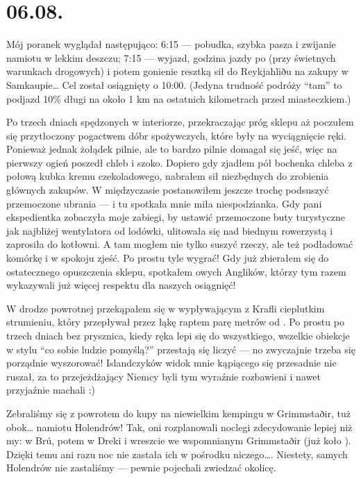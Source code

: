 \chapter*{06.08.}

Mój poranek wyglądał następująco: 6:15 --- pobudka, szybka pasza i zwijanie namiotu w lekkim deszczu; 7:15 --- wyjazd, godzina jazdy po  (przy świetnych warunkach drogowych) i potem gonienie resztką sił do Reykjahliðu na zakupy w Samkaupie… Cel został osiągnięty o 10:00. (Jedyna trudność podróży “tam” to podjazd 10\% długi na około 1 km na ostatnich kilometrach przed miasteczkiem.)

Po trzech dniach spędzonych w interiorze, przekraczając próg sklepu aż poczułem się przytłoczony pogactwem dóbr spożywczych, które były na wyciągnięcie ręki. Ponieważ jednak żołądek pilnie, ale to bardzo pilnie domagał się jeść, więc na pierwszy ogień poszedł chleb i szoko. Dopiero gdy zjadłem pół bochenka chleba z połową kubka kremu czekoladowego, nabrałem sił niezbędnych do zrobienia głównych zakupów. W międzyczasie postanowiłem jeszcze trochę podsuszyć przemoczone ubrania --- i tu spotkała mnie miła niespodzianka. Gdy pani ekspedientka zobaczyła moje zabiegi, by ustawić przemoczone buty turystyczne jak najbliżej wentylatora od lodówki, ulitowała się nad biednym rowerzystą i zaprosiła do kotłowni. A tam mogłem nie tylko suszyć rzeczy, ale też podładować komórkę i w spokoju zjeść. Po prostu tyle wygrać! Gdy już zbierałem się do ostatecznego opuszczenia sklepu, spotkałem owych Anglików, którzy tym razem wykazywali już więcej respektu dla naszych osiągnięć!

W drodze powrotnej przekąpałem się w wypływającym z Krafli cieplutkim strumieniu, który przepływał przez łąkę raptem parę metrów od . Po prostu po trzech dniach bez prysznica, kiedy ręka lepi się do wszystkiego, wszelkie obiekcje w stylu “co sobie ludzie pomyślą?” przestają się liczyć --- no zwyczajnie trzeba się porządnie wyszorować! Islandczyków widok mnie kąpiącego się przesadnie nie ruszał, za to przejeżdżający Niemcy byli tym wyraźnie rozbawieni i nawet przyjaźnie machali :)

Zebraliśmy się z powrotem do kupy na niewielkim kempingu w Grimmstaðir, tuż obok… namiotu Holendrów! Tak, oni rozplanowali noclegi zdecydowanie lepiej niż my: w Brú, potem w Dreki i wreszcie we wspomnianym Grimmstaðir (już koło ). Dzięki temu ani razu noc nie zastała ich w pośrodku niczego…. Niestety, samych Holendrów nie zastaliśmy --- pewnie pojechali zwiedzać okolicę.

